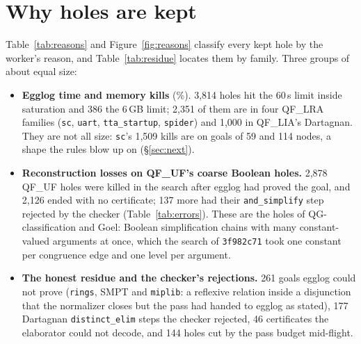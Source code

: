 \documentclass[11pt,a4paper]{article}
\newcommand{\UF}{QF\_UF}
\newcommand{\LIA}{QF\_LIA}
\newcommand{\LRA}{QF\_LRA}
\newcommand{\code}[1]{\texttt{#1}}
\begin{document}
\begin{table}[htbp]\centering\small

\caption{Elaboration phases per hole (seconds) and the phase a killed
  hole was in.}\label{tab:phases}
\end{table}

\clearpage
\section{Why holes are kept}\label{sec:kept}

Table~\ref{tab:reasons} and Figure~\ref{fig:reasons} classify every kept
hole by the worker's reason, and Table~\ref{tab:residue} locates them by
family. Three groups of about equal size:
\begin{itemize}
  \item \textbf{Egglog time and memory kills} (\eggshare\%). 3,814 holes hit
    the 60\,s limit inside saturation and 386 the 6\,GB limit; 2,351 of
    them are in four \LRA{} families (\code{sc}, \code{uart},
    \code{tta\_startup}, \code{spider}) and 1,000 in \LIA{}'s Dartagnan.
    They are not all size: \code{sc}'s 1,509 kills are on goals of 59 and
    114 nodes, a shape the rules blow up on (\S\ref{sec:next}).
  \item \textbf{Reconstruction losses on \UF{}'s coarse Boolean holes.}
    2,878 \UF{} holes were killed in the search after egglog had proved
    the goal, and 2,126 ended with no certificate; 137 more had their
    \code{and\_simplify} step rejected by the checker
    (Table~\ref{tab:errors}). These are the holes of QG-classification and
    Goel: Boolean simplification chains with many constant-valued
    arguments at once, which the search of \code{3f982c71} took one
    constant per congruence edge and one level per argument.
  \item \textbf{The honest residue and the checker's rejections.} 261
    goals egglog could not prove (\code{rings}, SMPT and \code{miplib}:
    a reflexive relation inside a disjunction that the normalizer closes
    but the pass had handed to egglog as stated), 177 Dartagnan
    \code{distinct\_elim} steps the checker rejected, 46 certificates the
    elaborator could not decode, and 144 holes cut by the pass budget
    mid-flight.
\end{itemize}

\begin{table}[htbp]\centering\small

\caption{Kept holes by reason. The runner files ``egglog could not
  prove'' (an egglog \code{Check failed} verdict) and the decode failures
  under \code{worker-error}; the split here is from the messages.}\label{tab:reasons}
\end{table}
\end{document}
